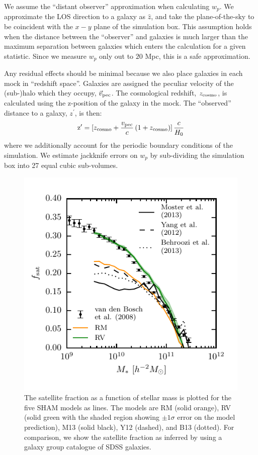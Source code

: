 \documentclass[useAMS,fleqn,usenatbib]{mnras}
\begin{document}
We assume the ``distant observer'' approximation when calculating $w_{p}$.  We approximate the LOS direction to a galaxy as $\hat{z}$, and take the plane-of-the-sky to be coincident with the $x-y$ plane of the simulation box.  This assumption holds when the distance between the ``observer'' and galaxies is much larger than the maximum separation between galaxies which enters the calculation for a given statistic.  Since we measure $w_{p}$ only out to $20$ Mpc, this is a safe approximation.

Any residual effects should be minimal because we also place galaxies in each mock in ``redshift space''.  Galaxies are assigned the peculiar velocity of the (sub-)halo which they occupy, $\vec{v}_{\rm pec}$.  The cosmological redshift, $z_{\rm cosmo}$, is calculated using the z-position of the galaxy in the mock.  The ``observed'' distance to a galaxy, $z^{\prime}$, is then:
%
\begin{equation}
\mathrm{z}^{\prime} = [z_{\rm cosmo} + \frac{v_{\rm pec}}{c} \,(1+z_{\rm cosmo}) ] \, \frac{c}{H_0}
\end{equation}
%
where we additionally account for the periodic boundary conditions of the simulation.  We estimate jackknife errors on $w_p$ by sub-dividing the simulation box into 27 equal cubic sub-volumes.

\begin{figure}
    \includegraphics[width=\columnwidth]{figures/f_sat_mstar.pdf}
    \caption{The satellite fraction as a function of stellar mass is plotted for the five SHAM models as lines.  The models are RM (solid orange), RV (solid green with the shaded region showing $\pm 1\sigma$ error on the model prediction), M13 (solid black), Y12 (dashed), and B13 (dotted).  For comparison, we show the satellite fraction as inferred by \citet{vandenBosch:2008fv} using a galaxy group catalogue of SDSS galaxies.}
    \label{fig:f_sat_mstar}
\end{figure}
\end{document}
